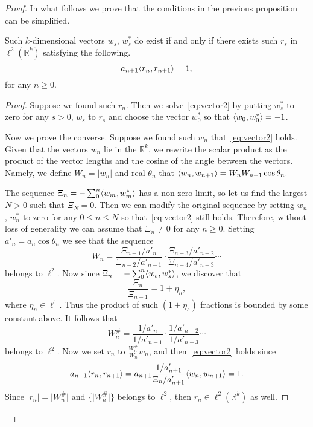 \begin{proof}
    In what follows we prove that the conditions in the previous proposition can be simplified.
    \begin{prop}
      \label{prop:reformulation-lw}
      Such $k$-dimensional vectors $w_s$, $w^*_s$ do exist if and only if there exists such $r_s$ in $\ell^2(\mathbb{R}^k)$
        satisfying the following.
      \begin{equation}
        \label{eq:vector3}
        a_{n+1} \langle r_n, r_{n+1} \rangle = 1,
      \end{equation}
      for any $n \geq 0$.
    \end{prop}
    \begin{proof}
      Suppose we found such $r_n$.
      Then we solve~\eqref{eq:vector2} by putting $w^*_s$ to zero for any $s > 0$, $w_s$ to $r_s$ and
        choose the vector $w^*_0$ so that $\langle w_0, w^*_0 \rangle = -1$.

      Now we prove the converse.
      Suppose we found such $w_n$ that~\eqref{eq:vector2} holds.
      Given that the vectors $w_n$ lie in the $\mathbb{R}^k$, we rewrite the scalar product as
        the product of the vector lengths and the cosine of the angle between the vectors.
      Namely, we define $W_n = \lvert w_n\rvert$ and real $\theta_n$ that
        $\langle w_{n}, w_{n+1} \rangle = W_n W_{n+1} \cos{\theta_n}.$

      The sequence $\Xi_n = -\sum_0^n \langle w_m, w^*_m \rangle$ has a non-zero limit, so let us
        find the largest $N > 0$ such that $\Xi_N = 0$.
      Then we can modify the original sequence by setting $w_n$, $w^*_n$ to zero for any $0 \leq n \leq N$ so that~\eqref{eq:vector2}
        still holds.
      Therefore, without loss of generality we can assume that $\Xi_n \neq 0$ for any $n \geq 0$.
      Setting $a'_n = a_n \cos{\theta_n}$ we see that the sequence
      \[
        W_n = \frac{\Xi_{n-1}/a'_n}{\Xi_{n-2}/a'_{n-1}} \cdot \frac{\Xi_{n-3}/a'_{n-2}}{\Xi_{n-4}/a'_{n-3}} \cdots
      \]
        belongs to $\ell^2$.
      Now since $\Xi_n = -\sum_0^n \langle w_s, w^*_s \rangle$, we discover that
      \[
        \frac{\Xi_n}{\Xi_{n-1}} = 1 + \eta_n,
      \]
        where $\eta_n \in \ell^1$.
      Thus the product of such $(1 + \eta_s)$ fractions is bounded by some constant above.
      It follows that
      \[
        W^\#_n = \frac{1/a'_n}{1/a'_{n-1}} \cdot \frac{1/a'_{n-2}}{1/a'_{n-3}} \cdots
      \]
        belongs to $\ell^2$.
      Now we set $r_n$ to $\frac{W^\#_n}{W_n}w_n$, and then~\eqref{eq:vector2} holds since
      \[
        a_{n+1} \langle r_n, r_{n+1} \rangle = a_{n+1} \frac{1/a'_{n+1}}{\Xi_n/a'_{n+1}} \langle w_n, w_{n+1} \rangle = 1.
      \]
      Since $\lvert r_n \rvert = \lvert W^\#_n \rvert$ and $\{\lvert W^\#_n \rvert\}$ belongs to $\ell^2$,
        then $r_n \in \ell^2(\mathbb{R}^k)$ as well.
    \end{proof}


\end{proof}
